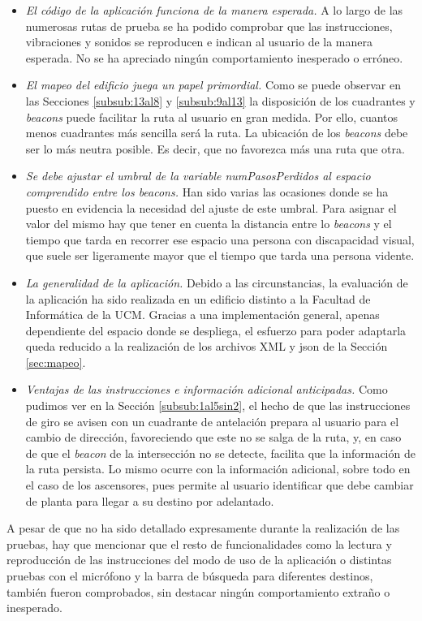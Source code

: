 \begin{itemize}
	\item \textit{El código de la aplicación funciona de la manera esperada.} A lo largo de las numerosas rutas de prueba se ha podido comprobar que las instrucciones, vibraciones y sonidos se reproducen e indican al usuario de la manera esperada. No se ha apreciado ningún comportamiento inesperado o erróneo. 
	
	\item \textit{El mapeo del edificio juega un papel primordial.} Como se puede observar en las Secciones \ref{subsub:13al8} y \ref{subsub:9al13} la disposición de los cuadrantes y \textit{beacons} puede facilitar la ruta al usuario en gran medida. Por ello, cuantos menos cuadrantes más sencilla será la ruta. La ubicación de los \textit{beacons} debe ser lo más neutra posible. Es decir, que no favorezca más una ruta que otra.
	
	\item  \textit{Se debe ajustar el umbral de la variable numPasosPerdidos al espacio comprendido entre los beacons.} Han sido varias las ocasiones donde se ha puesto en evidencia la necesidad del ajuste de este umbral. Para asignar el valor del mismo hay que tener en cuenta la distancia entre lo \textit{beacons} y el tiempo que tarda en recorrer ese espacio una persona con discapacidad visual, que suele ser ligeramente mayor que el tiempo que tarda una persona vidente.
	
	\item \textit{La generalidad de la aplicación.} Debido a las circunstancias, la evaluación de la aplicación ha sido realizada en un edificio distinto a la Facultad de Informática de la UCM. Gracias a una implementación general, apenas dependiente del espacio donde se despliega, el esfuerzo para poder adaptarla queda reducido a la realización de los archivos XML y json de la Sección \ref{sec:mapeo}.
	
	\item \textit{Ventajas de las instrucciones e información adicional anticipadas.} Como pudimos ver en la Sección \ref{subsub:1al5sin2}, el hecho de que las instrucciones de giro se avisen con un cuadrante de antelación prepara al usuario para el cambio de dirección, favoreciendo que este no se salga de la ruta, y, en caso de que el \textit{beacon} de la intersección no se detecte, facilita que la información de la ruta persista. Lo mismo ocurre con la información adicional, sobre todo en el caso de los ascensores, pues permite al usuario identificar que debe cambiar de planta para llegar a su destino por adelantado.

\end{itemize}

A pesar de que no ha sido detallado expresamente durante la realización de las pruebas, hay que mencionar que el resto de funcionalidades como la lectura y reproducción de las instrucciones del modo de uso de la aplicación o distintas pruebas con el micrófono y la barra de búsqueda para diferentes destinos, también fueron comprobados, sin destacar ningún comportamiento extraño o inesperado.

